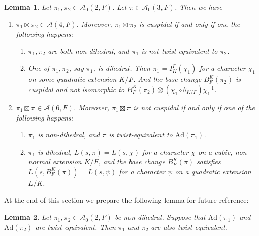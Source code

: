 \documentclass[12pt]{amsart}
\newcommand{\Ad}{\text{Ad}}
\newcommand{\cA}{\mathcal{A}}
\newtheorem{lemma}{Lemma}[section]
\begin{document}
\begin{lemma}\label{Rankin-Selberg product functorality}
    Let $\pi_1,\pi_2 \in \cA_0(2,F)$. Let $\pi \in \cA_0(3,F)$. Then we have 
    \begin{enumerate}
        \item $\pi_1 \boxtimes \pi_2 \in \cA(4,F)$. Moreover, $\pi_1 \boxtimes \pi_2$ is cuspidal if and only if one the following happens:
        \begin{enumerate}
            \item $\pi_1,\pi_2$ are both non-dihedral, and $\pi_1$ is not twist-equivalent to $\pi_2$.
            \item One of $\pi_1,\pi_2$, say $\pi_1$, is dihedral. Then $\pi_1 = I_K^F(\chi_1)$ for a character $\chi_1$ on some quadratic extension $K/F$. And the base change $B_F^K(\pi_2)$ is cuspidal and not isomorphic to $B_F^K(\pi_2) \otimes (\chi_1 \circ\theta_{K/F}) \chi_1^{-1}$.
        \end{enumerate}
        \item $\pi_1 \boxtimes \pi \in \cA(6,F)$. Moreover, $\pi_1 \boxtimes \pi$ is not cuspidal if and only if one of the following happens:
        \begin{enumerate}
            \item $\pi_1$ is non-dihedral, and $\pi$ is twist-equivalent to $\Ad(\pi_1)$.
            \item $\pi_1$ is dihedral, $L(s,\pi) = L(s,\chi)$ for a character $\chi$ on a cubic, non-normal extension $K/F$, and the base change $B_F^K(\pi)$ satisfies $L(s,B_F^K(\pi)) = L(s,\psi)$ for a character $\psi$ on a quadratic extension $L/K$.
        \end{enumerate}
    \end{enumerate}
\end{lemma}

At the end of this section we prepare the following lemma for future reference:

\begin{lemma}\label{multiplicity one}
        Let $\pi_1,\pi_2 \in \cA_0(2,F)$ be non-dihedral. Suppose that $\Ad(\pi_1)$ and $\Ad(\pi_2)$ are twist-equivalent. Then $\pi_1$ and $\pi_2$ are also twist-equivalent.
\end{lemma}
\end{document}
